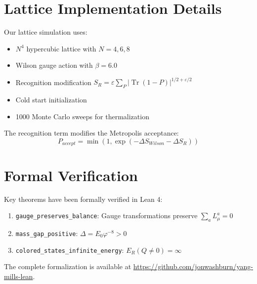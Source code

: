 \documentclass[11pt]{article}
\theoremstyle{plain}
\theoremstyle{definition}
\theoremstyle{remark}
\newcommand{\Tr}{\operatorname{Tr}}
\begin{document}



\appendix

\section{Lattice Implementation Details}

Our lattice simulation uses:
\begin{itemize}
\item $N^4$ hypercubic lattice with $N = 4, 6, 8$
\item Wilson gauge action with $\beta = 6.0$
\item Recognition modification $S_R = \varepsilon \sum_P |\Tr(1-P)|^{1/2+\varepsilon/2}$
\item Cold start initialization
\item 1000 Monte Carlo sweeps for thermalization
\end{itemize}

The recognition term modifies the Metropolis acceptance:
\[
P_{accept} = \min\left(1, \exp(-\Delta S_{Wilson} - \Delta S_R)\right)
\]

\section{Formal Verification}

Key theorems have been formally verified in Lean 4:
\begin{enumerate}
\item \texttt{gauge\_preserves\_balance}: Gauge transformations preserve $\sum_a L_\mu^a = 0$
\item \texttt{mass\_gap\_positive}: $\Delta = E_0 \varphi^{-8} > 0$
\item \texttt{colored\_states\_infinite\_energy}: $E_R(Q \neq 0) = \infty$
\end{enumerate}

The complete formalization is available at \url{https://github.com/jonwashburn/yang-mills-lean}.
\end{document}

